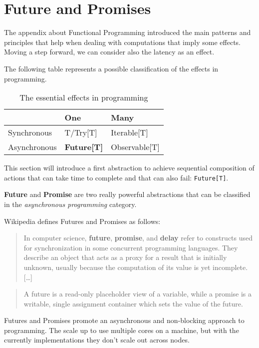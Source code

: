 \chapter{Future and Promises}\label{future-and-promises}

The appendix about Functional Programming introduced the main patterns
and principles that help when dealing with computations that imply some
effects. Moving a step forward, we can consider also the latency as an
effect.

The following table represents a possible classification of the effects
in programming.

\begin{table}[]
\centering
\caption{The essential effects in programming}
\label{my-label}
\begin{tabular}{|l|l|l|}
\hline
             & {\bf One}     & {\bf Many}        \\ \hline
Synchronous  & T/Try{[}T{]}  & Iterable{[}T{]}   \\ \hline
Asynchronous &  \textbf{Future{[}T{]}} &Observable{[}T{]} \\ \hline
\end{tabular}
\end{table}

This section will introduce a first abstraction to achieve sequential
composition of actions that can take time to complete and that can also
fail: \texttt{Future{[}T{]}}.

\textbf{Future} and \textbf{Promise} are two really powerful
abstractions that can be classified in the \emph{asynchronous
programming} category.

Wikipedia defines Futures and Promises as follows:

\begin{quote}
In computer science, \textbf{future}, \textbf{promise}, and
\textbf{delay} refer to constructs used for synchronization in some
concurrent programming languages. They describe an object that acts as a
proxy for a result that is initially unknown, usually because the
computation of its value is yet incomplete. {[}\ldots{}{]}
\end{quote}

\begin{quote}
A future is a read-only placeholder view of a variable, while a promise
is a writable, single assignment container which sets the value of the
future.
\end{quote}

Futures and Promises promote an asynchronous and non-blocking approach
to programming. The scale up to use multiple cores on a machine, but
with the currently implementations they don't scale out across nodes.

